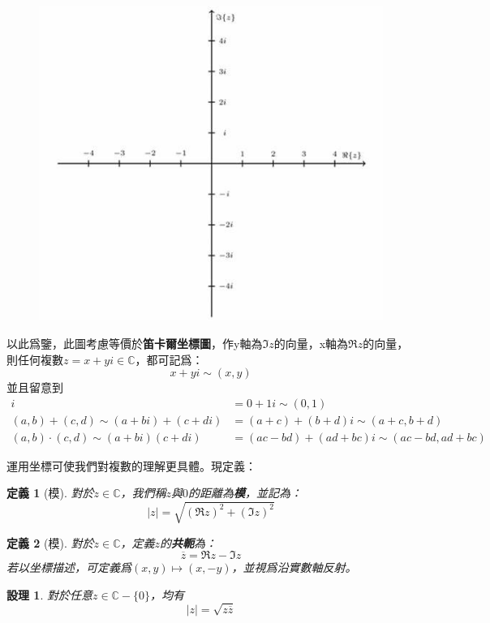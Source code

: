 \documentclass[12pt]{article}
\newtheorem{definition}{定義}
\newtheorem*{proposition}{設理}
\begin{document}
    \begin{figure}[H]
        \centering
        \includegraphics[scale=0.6]{argand.jpg}
    \end{figure}

    以此爲鑒，此圖考慮等價於\textbf{笛卡爾坐標圖}，作y軸為$\Im{z}$的向量，x軸為$\Re{z}$的向量，則任何複數$z=x+yi\in\mathbb{C}$，都可記爲：$$x+yi\sim(x,y)$$
    並且留意到\begin{align*}
        i&=0+1i\sim(0,1)\\
        (a,b)+(c,d)\sim (a+bi)+(c+di)&=(a+c)+(b+d)i\sim(a+c,b+d)\\
        (a,b)\cdot (c,d)\sim(a+bi)(c+di)&=(ac-bd)+(ad+bc)i\sim(ac-bd,ad+bc)
    \end{align*}

    運用坐標可使我們對複數的理解更具體。現定義：

    \begin{definition}[模]
        對於$z\in\mathbb{C}$，我們稱$z$與$0$的距離為\textbf{模}，並記為：$$|z|=\sqrt{(\Re{z})^2+(\Im{z})^2}$$
    \end{definition}

    \begin{definition}[模]
        對於$z\in\mathbb{C}$，定義$z$的\textbf{共軛}為：$$\overline{z}=\Re{z}-\Im{z}$$若以坐標描述，可定義爲$(x,y)\mapsto(x,-y)$，並視爲沿實數軸反射。
    \end{definition}

    \begin{proposition}
        對於任意$z\in\mathbb{C}-\{0\}$，均有$$|z|=\sqrt{z\overline{z}}$$
    \end{proposition}
\end{document}
